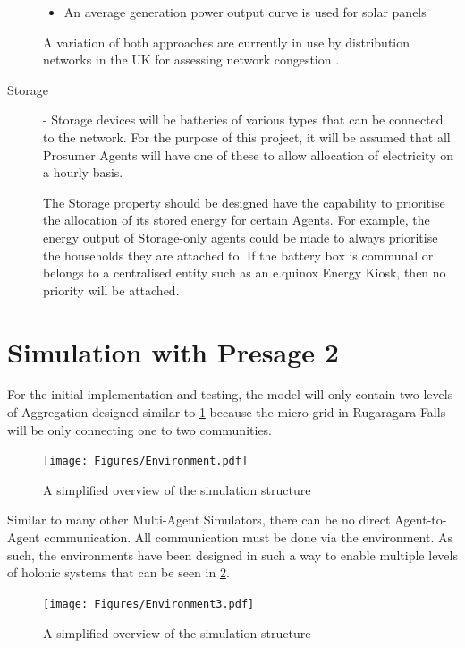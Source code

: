 \begin{description}
\begin{itemize}
  \item An average generation power output curve is used for solar panels

\end{itemize}

A variation of both approaches are currently in use by distribution networks in the UK for assessing network congestion \cite{IPSA-web-constraint:2015}. \

\item[Storage] - Storage devices will be batteries of various types that can be connected to the network. For the purpose of this project, it will be assumed that all Prosumer Agents will have one of these to allow allocation of electricity on a hourly basis.

The Storage property should be designed have the capability to prioritise the allocation of its stored energy for certain Agents. For example, the energy output of Storage-only agents could be made to always prioritise the households they are attached to. If the battery box is communal or belongs to a centralised entity such as an e.quinox Energy Kiosk, then no priority will be attached.
\end{description}
\section*{Simulation with Presage 2}
For the initial implementation and testing, the model will only contain two levels of Aggregation designed similar to \ref{fig:SimEnv} because the micro-grid in Rugaragara Falls will be only connecting one to two communities. 

\begin{figure}[h!]
	\centering
	\texttt{[image: Figures/Environment.pdf]}
	\caption{A simplified overview of the simulation structure}
	\label{fig:SimEnv}
\end{figure}

Similar to many other Multi-Agent Simulators, there can be no direct Agent-to-Agent communication. All communication must be done via the environment. As such, the environments have been designed in such a way to enable multiple levels of holonic systems that can be seen in \ref{fig:SimEnv2}. 

\begin{figure}[h!]
	\centering
	\texttt{[image: Figures/Environment3.pdf]}
	\caption{A simplified overview of the simulation structure}
	\label{fig:SimEnv2}
\end{figure}

